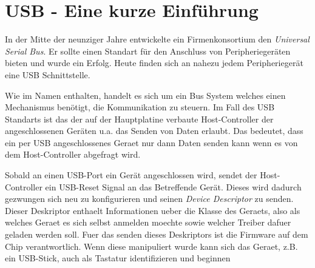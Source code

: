 \chapter{USB - Eine kurze Einführung}
In der Mitte der neunziger Jahre entwickelte ein Firmenkonsortium den \textit{Universal Serial Bus}.
Er sollte einen Standart für den Anschluss von Peripheriegeräten bieten und wurde ein Erfolg.
Heute finden sich an nahezu jedem Peripheriegerät eine USB Schnittstelle.

Wie im Namen enthalten, handelt es sich um ein Bus System welches einen Mechanismus benötigt, die Kommunikation zu steuern.
Im Fall des USB Standarts ist das der auf der Hauptplatine verbaute Host-Controller der angeschlossenen Geräten u.a. das Senden von Daten erlaubt.
Das bedeutet, dass ein per USB angeschlossenes Geraet nur dann Daten senden kann wenn es von dem Host-Controller abgefragt wird.

Sobald an einen USB-Port ein Gerät angeschlossen wird, sendet der Host-Controller ein USB-Reset Signal an das Betreffende Gerät.
Dieses wird dadurch gezwungen sich neu zu konfigurieren und seinen \textit{Device Descriptor} zu senden.
Dieser Deskriptor enthaelt Informationen ueber die Klasse des Geraets, also als welches Geraet es sich selbst anmelden moechte sowie welcher Treiber dafuer geladen werden soll.
Fuer das senden dieses Deskriptors ist die Firmware auf dem Chip verantwortlich.
Wenn diese manipuliert wurde kann sich das Geraet, z.B. ein USB-Stick, auch als Tastatur identifizieren und beginnen 
